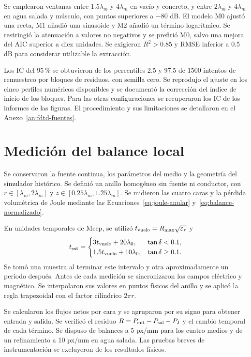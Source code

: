 Se emplearon ventanas entre $1.5\lambda_m$ y $4\lambda_m$ en vacío y concreto, y entre $2\lambda_m$ y $4\lambda_m$ en agua salada y músculo, con puntos superiores a $-80$ dB. El modelo M0 ajustó una recta, M1 añadió una sinusoide y M2 añadió un término logarítmico. Se restringió la atenuación a valores no negativos y se prefirió M0, salvo una mejora del AIC superior a diez unidades. Se exigieron $R^2>0.85$ y RMSE inferior a 0.5 dB para considerar utilizable la extracción.

Los IC del 95\,\% se obtuvieron de los percentiles 2.5 y 97.5 de 1500 intentos de remuestreo por bloques de residuos, con semilla cero. Se reprodujo el ajuste en los cinco perfiles numéricos disponibles y se documentó la corrección del índice de inicio de los bloques. Para las otras configuraciones se recuperaron los IC de los informes de las figuras. El procedimiento y sus limitaciones se detallaron en el Anexo~\ref{an:fdtd-fuentes}.

\section{Medición del balance local}
Se conservaron la fuente continua, los parámetros del medio y la geometría del simulador histórico. Se definió un anillo homogéneo sin fuente ni conductor, con $r\in[\lambda_m,2\lambda_m]$ y $z\in[0.25\lambda_m,1.25\lambda_m]$. Se midieron las cuatro caras y la pérdida volumétrica de Joule mediante las Ecuaciones~\ref{eq:joule-anular} y~\ref{eq:balance-normalizado}.

En unidades temporales de Meep, se utilizó $t_{\rm vuelo}=R_{\max}\sqrt{\varepsilon_r}$ y
\begin{equation}
 t_{\rm est}=\begin{cases}3t_{\rm vuelo}+20\lambda_0,&\tan\delta<0.1,\\1.5t_{\rm vuelo}+10\lambda_0,&\tan\delta\geq0.1.\end{cases}
\end{equation}
Se tomó una muestra al terminar este intervalo y otra aproximadamente un período después. Antes de cada medición se sincronizaron los campos eléctrico y magnético. Se interpolaron sus valores en puntos físicos del anillo y se aplicó la regla trapezoidal con el factor cilíndrico $2\pi r$.

Se calcularon los flujos netos por cara y se agruparon por su signo para obtener entrada y salida. Se verificó el residuo $R=P_{\rm ent}-P_{\rm sal}-P_{\rm J}$ y el cambio temporal de cada término. Se dispuso de balances a 5 px/mm para los cuatro medios y de un refinamiento a 10 px/mm en agua salada. Las pruebas breves de instrumentación se excluyeron de los resultados físicos.

